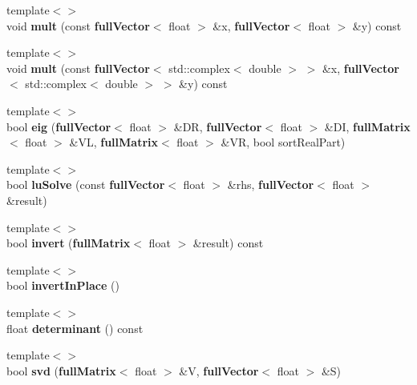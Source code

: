 \begin{DoxyCompactItemize}
\item 
{\footnotesize template$<$$>$ }\\void {\bfseries mult} (const {\bf full\-Vector}$<$ float $>$ \&x, {\bf full\-Vector}$<$ float $>$ \&y) const\label{classfullMatrix_a55fb3f95c0f4df7f29b079ee7ca7375e}

\item 
{\footnotesize template$<$$>$ }\\void {\bfseries mult} (const {\bf full\-Vector}$<$ std\-::complex$<$ double $>$ $>$ \&x, {\bf full\-Vector}$<$ std\-::complex$<$ double $>$ $>$ \&y) const\label{classfullMatrix_adac30f005dda7115027631d1b16c6408}

\item 
{\footnotesize template$<$$>$ }\\bool {\bfseries eig} ({\bf full\-Vector}$<$ float $>$ \&D\-R, {\bf full\-Vector}$<$ float $>$ \&D\-I, {\bf full\-Matrix}$<$ float $>$ \&V\-L, {\bf full\-Matrix}$<$ float $>$ \&V\-R, bool sort\-Real\-Part)\label{classfullMatrix_a87ce34a99a7ac9e16c47d6f9dab98540}

\item 
{\footnotesize template$<$$>$ }\\bool {\bfseries lu\-Solve} (const {\bf full\-Vector}$<$ float $>$ \&rhs, {\bf full\-Vector}$<$ float $>$ \&result)\label{classfullMatrix_ab9d45451fc0500ec52eff9a47f5e3d06}

\item 
{\footnotesize template$<$$>$ }\\bool {\bfseries invert} ({\bf full\-Matrix}$<$ float $>$ \&result) const\label{classfullMatrix_aa3293aa76d5f1b215097f390923d1968}

\item 
{\footnotesize template$<$$>$ }\\bool {\bfseries invert\-In\-Place} ()\label{classfullMatrix_a1c6364fb8d23a4544e95b3bc42e63115}

\item 
{\footnotesize template$<$$>$ }\\float {\bfseries determinant} () const\label{classfullMatrix_a66344b0277cd1201448e51ae73883ba7}

\item 
{\footnotesize template$<$$>$ }\\bool {\bfseries svd} ({\bf full\-Matrix}$<$ float $>$ \&V, {\bf full\-Vector}$<$ float $>$ \&S)\label{classfullMatrix_aeeb27efffe2375f72e7d7225893cc338}

\end{DoxyCompactItemize}


